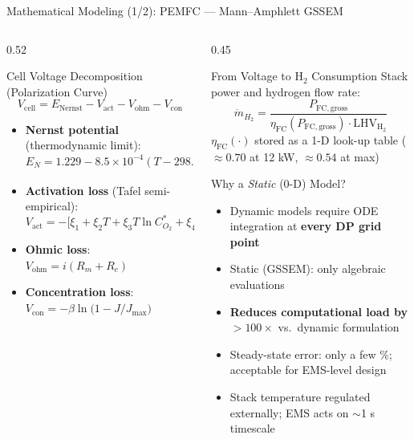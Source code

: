 \documentclass[aspectratio=169, 10pt]{beamer}
\newcommand{\etaFC}{\eta_{\mathrm{FC}}}
\newcommand{\LHV}{\mathrm{LHV}_{\mathrm{H_2}}}
\newcommand{\highlight}[1]{\textcolor{fcgold!80!black}{\textbf{#1}}}
\begin{document}
\begin{frame}{Mathematical Modeling (1/2): PEMFC — Mann–Amphlett GSSEM}
  \begin{columns}[T]
    \begin{column}{0.52\textwidth}
      \begin{block}{Cell Voltage Decomposition (Polarization Curve)}
        \[
          V_{\mathrm{cell}} = E_{\mathrm{Nernst}} - V_{\mathrm{act}} - V_{\mathrm{ohm}} - V_{\mathrm{con}}
        \]
        \begin{itemize}
          \item \textbf{Nernst potential} (thermodynamic limit):
          \[
            E_N = 1.229 - 8.5\!\times\!10^{-4}(T\!-\!298.15)
                  + 4.31\!\times\!10^{-5}T\!\ln\!\bigl(p^*_{H_2}\,p^{*1/2}_{O_2}\bigr)
          \]
          \item \textbf{Activation loss} (Tafel semi-empirical):
          \[
            V_{\mathrm{act}} = -\bigl[\xi_1 + \xi_2 T + \xi_3 T\ln C^*_{O_2} + \xi_4 T\ln i\bigr]
          \]
          \item \textbf{Ohmic loss}: $V_{\mathrm{ohm}} = i(R_m + R_c)$
          \item \textbf{Concentration loss}:
          $V_{\mathrm{con}} = -\beta\ln\!\bigl(1 - J/J_{\max}\bigr)$
        \end{itemize}
      \end{block}
    \end{column}
    \begin{column}{0.45\textwidth}
      \begin{block}{From Voltage to H$_2$ Consumption}
        Stack power and hydrogen flow rate:
        \[
          \dot{m}_{H_2} = \frac{P_{\mathrm{FC,gross}}}{\etaFC(P_{\mathrm{FC,gross}})\cdot\LHV}
        \]
        $\etaFC(\cdot)$ stored as a 1-D look-up table ($\approx 0.70$ at 12 kW, $\approx 0.54$ at max)
      \end{block}
      \vspace{4pt}
      \begin{alertblock}{Why a \emph{Static} (0-D) Model?}
        \begin{itemize}
          \item Dynamic models require ODE integration at \textbf{every DP grid point}
          \item Static (GSSEM): only algebraic evaluations
          \item \highlight{Reduces computational load by $>100\times$} vs.\ dynamic formulation
          \item Steady-state error: only a few \%; acceptable for EMS-level design
          \item Stack temperature regulated externally; EMS acts on $\sim$1 s timescale
        \end{itemize}
      \end{alertblock}
    \end{column}
  \end{columns}
\end{frame}
\end{document}
